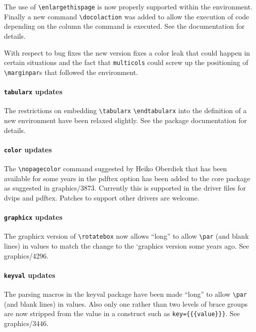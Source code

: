 \documentclass{ltnews}
\begin{document}
The use of \verb=\enlargethispage= is now properly supported
within the environment. Finally a new command \verb=\docolaction= was
added to allow the execution of code depending on the column the
command is executed. See the documentation for details.

With respect to bug fixes the new version fixes a color leak that
could happen in certain situations and the fact that
\texttt{multicols} could screw up the positioning of
\verb=\marginpar=s that followed the environment.

\paragraph{\texttt{tabularx} updates}

The restrictions on embedding \verb|\tabularx| \verb|\endtabularx|
into the definition of a new environment have been relaxed
slightly. See the package documentation for details.

\paragraph{\texttt{color} updates}

The \verb|\nopagecolor| command suggested by Heiko Oberdiek that has
been available for some years in the \textsf{pdftex} option has been
added to the core package as suggested in graphics/3873. Currently
this is supported in the driver files for \textsf{dvips} and
\textsf{pdftex}.  Patches to support other drivers are welcome.

 \paragraph{\texttt{graphicx} updates}

The \textsf{graphicx} version of \verb|\rotatebox| now allows ``long''
to allow \verb|\par| (and blank lines) in values to match the change
to the `\textsf{graphics} version some years ago. See graphics/4296.

\paragraph{\texttt{keyval} updates}

The parsing macros in the \textsf{keyval} package have been made
``long'' to allow \verb|\par| (and blank lines) in values. Also only
one rather than two levels of brace groups are now stripped from the
value in a construct such as \verb|key={{{value}}}|. See
graphics/3446.
\end{document}
